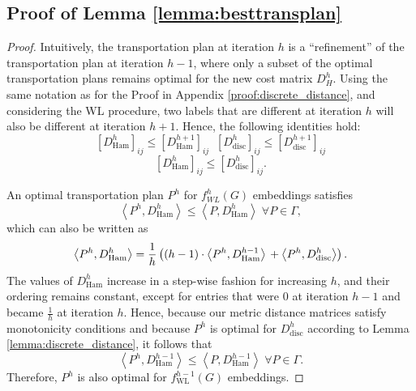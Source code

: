 \documentclass{article}
\begin{document}
\subsection{Proof of Lemma \ref{lemma:besttransplan}}
\label{proof:besttransplan}
\begin{proof}
Intuitively, the transportation plan at iteration $h$ is a ``refinement'' of the transportation plan at iteration $h-1$, where only a subset of the optimal transportation plans remains optimal for the new cost matrix $D_H^h$.
Using the same notation as for the Proof in Appendix \ref{proof:discrete_distance},
and considering the WL procedure, two labels that are different at iteration $h$ will also be different at iteration $h+1$. Hence, the following identities hold:
$$
\left [D_{\mathrm{Ham}}^h \right ]_{ij} \leq
\left [D_{\mathrm{Ham}}^{h+1} \right ]_{ij}\;\; 
\left [D_{\mathrm{disc}}^h \right ]_{ij} \leq
\left [D_{\mathrm{disc}}^{h+1} \right ]_{ij}
$$
$$
\left [D_{\mathrm{Ham}}^h \right ]_{ij} \leq
\left [D_{\mathrm{disc}}^{h} \right ]_{ij}.
$$


An optimal transportation plan $P^{h}$ for $f^{h}_{\scriptscriptstyle{WL}}(G)$ embeddings satisfies
$$
  \left \langle P^{h}, D_{\mathrm{Ham}}^{h}\right \rangle \leq \left \langle P, D_{\mathrm{Ham}}^{h}\right \rangle \; \forall P \in \Gamma,
$$
which can also be written as
$$
\left \langle P^{h}, D_{\mathrm{Ham}}^{h}\right \rangle =
\frac{1}{h} \left ((h-1) \cdot \left \langle P^{h}, D_{\mathrm{Ham}}^{h-1} \right \rangle\\
+ \left \langle P^{h}, D_{\mathrm{disc}}^{h} \right \rangle \right ).
$$
The values of $D_\mathrm{Ham}^h$ increase in a step-wise fashion for increasing $h$, and their ordering remains constant, except for entries that were $0$ at iteration $h-1$ and became $\frac{1}{h}$ at iteration $h$. Hence, because our metric distance matrices satisfy monotonicity conditions and because $P^h$ is optimal for $D_\mathrm{disc}^h$ according to Lemma \ref{lemma:discrete_distance}, it follows that
$$
\left \langle P^{h}, D_{\mathrm{Ham}}^{h-1}\right \rangle \leq \left \langle P, D_{\mathrm{Ham}}^{h-1}\right \rangle \; \forall P \in \Gamma.
$$
Therefore, $P^h$ is also optimal for $f^{h-1}_{\mathrm{\scriptscriptstyle{WL}}}(G)$ embeddings.
\end{proof}
\end{document}
